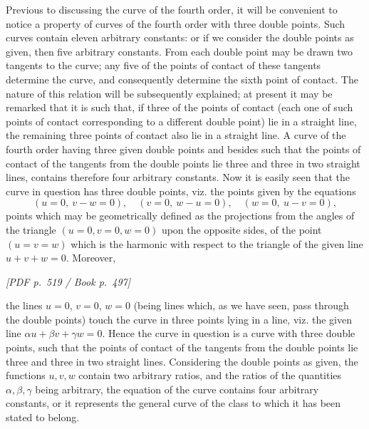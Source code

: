\documentclass[11pt]{article}
\newcommand{\Page}[2]{\bigskip\noindent\textit{[PDF p.~#1 / Book p.~#2]}\par\smallskip}
\begin{document}
Previous to discussing the curve of the fourth order, it will be convenient to notice
a property of curves of the fourth order with three double points. Such curves contain
eleven arbitrary constants: or if we consider the double points as given, then five
arbitrary constants. From each double point may be drawn two tangents to the curve;
any five of the points of contact of these tangents determine the curve, and consequently
determine the sixth point of contact. The nature of this relation will be subsequently
explained; at present it may be remarked that it is such that, if three of the points
of contact (each one of such points of contact corresponding to a different double
point) lie in a straight line, the remaining three points of contact also lie in a
straight line. A curve of the fourth order having three given double points and besides
such that the points of contact of the tangents from the double points lie three and
three in two straight lines, contains therefore four arbitrary constants. Now it is
easily seen that the curve in question has three double points, viz. the points given
by the equations
\[
(u=0,\ v-w=0),\quad (v=0,\ w-u=0),\quad (w=0,\ u-v=0),
\]
points which may be geometrically defined as the projections from the angles of the
triangle $(u=0,v=0,w=0)$ upon the opposite sides, of the point $(u=v=w)$ which is
the harmonic with respect to the triangle of the given line $u+v+w=0$. Moreover,

\Page{519}{497}

\noindent the lines $u=0$, $v=0$, $w=0$ (being lines which, as we have seen, pass through
the double points) touch the curve in three points lying in a line, viz. the given
line $\alpha u+\beta v+\gamma w=0$. Hence the curve in question is a curve with three
double points, such that the points of contact of the tangents from the double points
lie three and three in two straight lines. Considering the double points as given, the
functions $u,v,w$ contain two arbitrary ratios, and the ratios of the quantities
$\alpha,\beta,\gamma$ being arbitrary, the equation of the curve contains four arbitrary
constants, or it represents the general curve of the class to which it has been stated
to belong.
\end{document}
